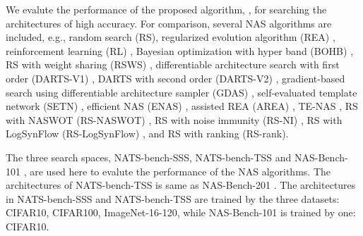 \documentclass[sigconf]{acmart}
\begin{document}
    We evalute the performance of the proposed algorithm, \palg{}, 
    for searching the architectures of high accuracy. For comparison, several NAS 
    algorithms are included, e.g., random search (RS), regularized evolution algorithm 
    (REA) \cite{real2019regularized}, reinforcement learning (RL) \cite{Williams:92}, 
    Bayesian optimization with hyper band (BOHB) \cite{falkner2018bohb}, RS with 
    weight sharing (RSWS) \cite{li2019random}, differentiable architecture search 
    with first order (DARTS-V1) \cite{liu2019darts}, DARTS with second order 
    (DARTS-V2) \cite{liu2019darts}, gradient-based search using differentiable 
    architecture sampler (GDAS) \cite{dong2019searching}, self-evaluated template 
    network (SETN) \cite{Dong_2019}, efficient NAS (ENAS) \cite{pham2018efficient}, 
    assisted REA (AREA) \cite{https://doi.org/10.48550/arxiv.2006.04647}, 
    TE-NAS \cite{https://doi.org/10.48550/arxiv.2102.11535}, RS with NASWOT (RS-NASWOT) \cite{https://doi.org/10.48550/arxiv.2006.04647}, 
    RS with noise immunity (RS-NI) \cite{10092788}, RS with LogSynFlow (RS-LogSynFlow) \cite{Cavagnero_2023}, 
    and RS with ranking (RS-rank). 

    The three search spaces, NATS-bench-SSS, NATS-bench-TSS 
    \cite{Dong_2021} and NAS-Bench-101 \cite{ying2019nasbench101}, are used 
    here to evalute the performance of the NAS algorithms. The architectures 
    of NATS-bench-TSS is same as NAS-Bench-201 \cite{dong2020nasbench201}. 
    The architectures in NATS-bench-SSS and NATS-bench-TSS are trained by the three datasets: 
    CIFAR10, CIFAR100, ImageNet-16-120, while NAS-Bench-101 is trained by one: 
    CIFAR10. 
\end{document}
